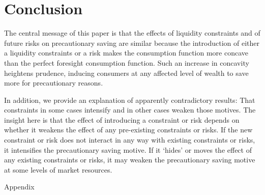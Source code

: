 \documentclass[titlepage]{\econtex}
\begin{document}
\section{Conclusion}

The central message of this paper is that the effects of liquidity constraints and of future risks on precautionary saving are similar because the introduction of either a liquidity constraints or a risk makes the consumption function more concave than the perfect foresight consumption function. Such an increase in concavity heightens prudence, inducing consumers at any affected level of wealth to save more for precautionary reasons. 

In addition, we provide an explanation of apparently contradictory results: That constraints in some cases intensify and in other cases weaken those motives. The insight here is that the effect of introducing a constraint or risk depends on whether it weakens the effect of any pre-existing constraints or risks. If the new constraint or risk does not interact in any way with existing constraints or risks, it intensifies the precautionary saving motive. If it `hides' or moves the effect of any existing constraints or risks, it may weaken the precautionary saving motive at some levels of market resources.

\vfill\eject
\appendix

\centerline{\LARGE Appendix}
\medskip
\end{document}
